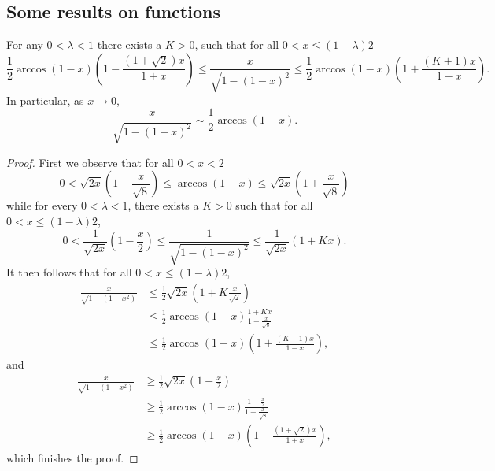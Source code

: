 \begin{appendices}
\section{Some results on functions}

\begin{lemma}\label{lem:arccos_approx}
For any $0 < \lambda < 1$ there exists a $K > 0$, such that for all $0 < x \le (1 - \lambda)2$
\[
	\frac{1}{2}\arccos(1-x)\left(1 - \frac{(1+\sqrt{2})x}{1 + x}\right)
	\le \frac{x}{\sqrt{1-(1-x)^2}} 
	\le \frac{1}{2}\arccos(1-x)\left(1 + \frac{(K+1)x}{1-x}\right).
\]
In particular, as $x \to 0$,
\[
	\frac{x}{\sqrt{1-(1-x)^2}} \sim \frac{1}{2}\arccos(1-x).
\]
\end{lemma}

\begin{proof}
First we observe that for all $0 < x < 2$
\[
	0 < \sqrt{2x}\left(1 - \frac{x}{\sqrt{8}}\right) \le \arccos(1-x) \le 
	\sqrt{2x}\left(1 + \frac{x}{\sqrt{8}}\right)
\]
while for every $0 < \lambda < 1$, there exists a $K > 0$ such that for all $0 < x \le (1-\lambda) 2$,
\[
	0 < \frac{1}{\sqrt{2x}}\left(1 - \frac{x}{2}\right) \le \frac{1}{\sqrt{1 - (1 - x)^2}} \le
	\frac{1}{\sqrt{2x}}\left(1 + K x\right).
\]
It then follows that for all $0 < x \le (1-\lambda) 2$,
\begin{align*}
	\frac{x}{\sqrt{1 - (1-x^2)}} &\le \frac{1}{2} \sqrt{2x}\left(1 + K\frac{x}{\sqrt{2}}\right)\\
	&\le \frac{1}{2} \arccos(1-x) \frac{1 + Kx}{1 - \frac{x}{\sqrt{8}}}\\
	&\le \frac{1}{2} \arccos(1-x)\left(1 + \frac{(K + 1)x}{1 - x}\right),
\end{align*}
and
\begin{align*}
	\frac{x}{\sqrt{1 - (1-x^2)}} &\ge \frac{1}{2} \sqrt{2x}\left(1 - \frac{x}{2}\right)\\
	&\ge \frac{1}{2} \arccos(1-x) \frac{1 - \frac{x}{2}}{1 + \frac{x}{\sqrt{8}}}\\
	&\ge \frac{1}{2} \arccos(1-x)\left(1 - \frac{(1+\sqrt{2})x}{1 + x}\right),
\end{align*}
which finishes the proof.
\end{proof}


\end{appendices}
